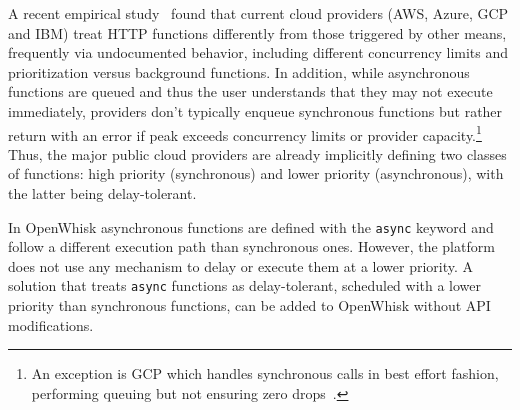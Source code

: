 \label{sec:motivation:currentStatus}
A recent empirical study~\cite{Tariq:SOCC:2020:Sequoia} found that current cloud providers (AWS, Azure, GCP and IBM) treat HTTP functions differently from those triggered by other means, frequently via undocumented behavior, including different concurrency limits and prioritization versus background functions.
In addition, while asynchronous functions are queued and thus the user understands that they may not execute immediately, providers don't typically enqueue synchronous functions but rather return with an error if peak exceeds concurrency limits or provider capacity.\footnote{An exception is GCP which handles synchronous calls in best effort fashion, performing queuing but not ensuring zero drops~\cite{Tariq:SOCC:2020:Sequoia}.}
%
Thus, the major public cloud providers are already implicitly defining two classes of functions: high priority (synchronous) and lower priority (asynchronous), with the latter being delay-tolerant.

In OpenWhisk asynchronous functions are defined with the \texttt{async} keyword and follow a different execution path than synchronous ones.
However, the platform does not use any mechanism to delay or execute them at a lower priority.
A solution that treats \texttt{async} functions as delay-tolerant, scheduled with a lower priority than synchronous functions, can be added to OpenWhisk without API modifications.

%
%

